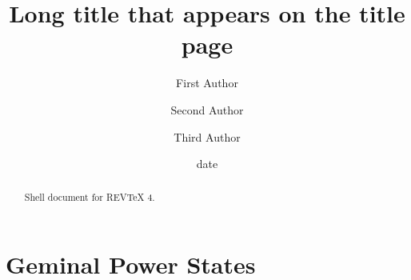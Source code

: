 \documentclass[aps,preprint]{revtex4}%
\begin{document}
\title[Short title for running header]{Long title that appears on the title page}
\author{First Author}
\author{Second Author}
\author{Third Author}

\begin{abstract}
Shell document for REV\TeX{} 4.

\end{abstract}
\date[Date text]{date}




\maketitle
\tableofcontents


\section{Geminal Power States}
\end{document}

